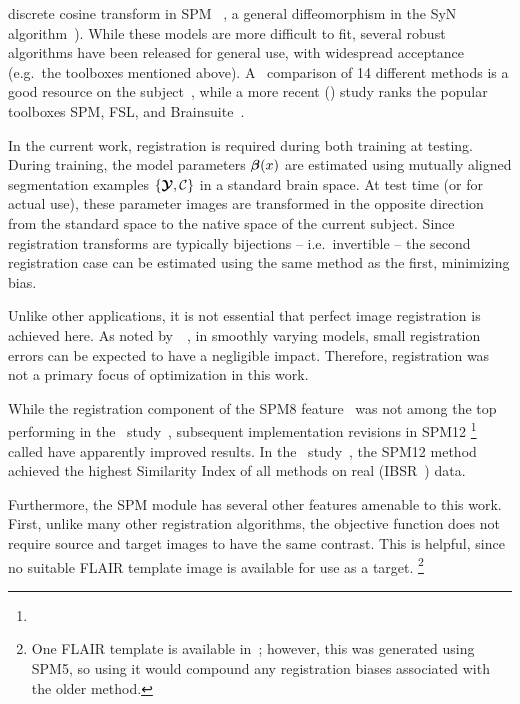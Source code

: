 discrete cosine transform in SPM ~\cite{Ashburner1997,Ashburner2005},
a general diffeomorphism in the SyN algorithm~\cite{Avants2008}).
While these models are more difficult to fit,
several robust algorithms have been released for general use,
with widespread acceptance (e.g.\ the toolboxes mentioned above).
A~\citeyear{Klein2009} comparison of 14 different methods
is a good resource on the subject~\cite{Klein2009},
while a more recent (\citeyear{Kazemi2014}) study
ranks the popular toolboxes SPM, FSL, and Brainsuite~\cite{Kazemi2014}.
\par
In the current work, registration is required during both training at testing.
During training, the model parameters $\bm{\beta}(x)$ are estimated using
mutually aligned segmentation examples $\{\bm{\mathcal{Y}},\mathcal{C}\}$ in a standard brain space.
At test time (or for actual use), these parameter images
are transformed in the opposite direction from the standard space
to the native space of the current subject.
Since registration transforms are typically bijections -- i.e.\ invertible --
the second registration case can be estimated using the same method as the first, minimizing bias.
\par
Unlike other applications, it is not essential that perfect image registration is achieved here.
As noted by~\citeauthor{Harmouche2015}~\cite{Harmouche2015}, in smoothly varying models,
small registration errors can be expected to have a negligible impact.
Therefore, registration was not a primary focus of optimization in this work.
\par
While the registration component of the SPM8  feature~\cite{Ashburner2005}
was not among the top performing in the~\citeyear{Klein2009} study~\cite{Klein2009},
subsequent implementation revisions in SPM12%
\footnote{}
called  have apparently improved results.
In the~\citeyear{Kazemi2014} study~\cite{Kazemi2014}, the SPM12  method
achieved the highest Similarity Index of all methods on real (IBSR~\cite{IBSR}) data.
\par
Furthermore, the SPM module has several other features amenable to this work.
First, unlike many other registration algorithms,
the objective function does not require source and target images to have the same contrast.
This is helpful, since no suitable FLAIR template image is available for use as a target.%
\footnote{One FLAIR template is available in~\cite{Winkler2012};
  however, this was generated using SPM5, so using it
  would compound any registration biases associated with the older method.}
